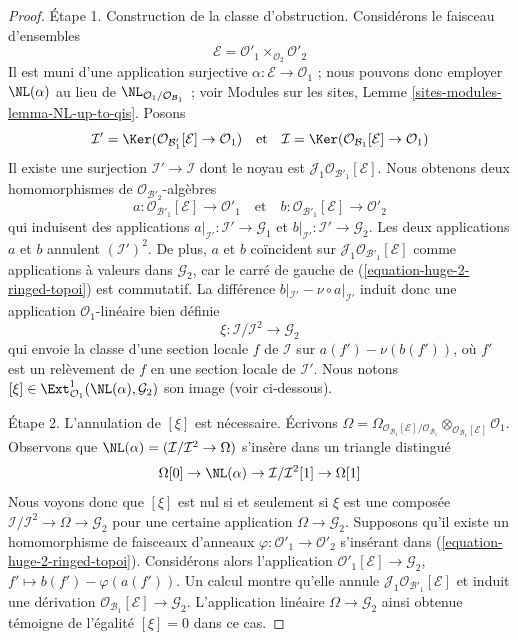 \begin{proof}
\medskip\noindent
Étape 1. Construction de la classe d'obstruction. Considérons le faisceau
d'ensembles
$$
\mathcal{E} = \mathcal{O}'_1 \times_{\mathcal{O}_2} \mathcal{O}'_2
$$
Il est muni d'une application surjective
$\alpha : \mathcal{E} \to \mathcal{O}_1$ ; nous pouvons donc employer
$\NL(\alpha)$ au lieu de
$\NL_{\mathcal{O}_1/\mathcal{O}_{\mathcal{B}_1}}$ ; voir Modules sur les sites,
Lemme \ref{sites-modules-lemma-NL-up-to-qis}.
Posons
$$
\mathcal{I}' =
\Ker(\mathcal{O}_{\mathcal{B}'_1}[\mathcal{E}] \to \mathcal{O}_1)
\quad\text{et}\quad
\mathcal{I} =
\Ker(\mathcal{O}_{\mathcal{B}_1}[\mathcal{E}] \to \mathcal{O}_1)
$$
Il existe une surjection $\mathcal{I}' \to \mathcal{I}$ dont le noyau est
$\mathcal{J}_1\mathcal{O}_{\mathcal{B}'_1}[\mathcal{E}]$.
Nous obtenons deux homomorphismes de $\mathcal{O}_{\mathcal{B}'_2}$-algèbres
$$
a : \mathcal{O}_{\mathcal{B}'_1}[\mathcal{E}] \to \mathcal{O}'_1
\quad\text{et}\quad
b : \mathcal{O}_{\mathcal{B}'_1}[\mathcal{E}] \to \mathcal{O}'_2
$$
qui induisent des applications
$a|_{\mathcal{I}'} : \mathcal{I}' \to \mathcal{G}_1$ et
$b|_{\mathcal{I}'} : \mathcal{I}' \to \mathcal{G}_2$. Les deux applications
$a$ et $b$ annulent $(\mathcal{I}')^2$. De plus, $a$ et $b$ coïncident sur
$\mathcal{J}_1\mathcal{O}_{\mathcal{B}'_1}[\mathcal{E}]$ comme applications
à valeurs dans $\mathcal{G}_2$, car le carré de gauche de
(\ref{equation-huge-2-ringed-topoi}) est commutatif. La différence
$b|_{\mathcal{I}'} - \nu \circ a|_{\mathcal{I}'}$ induit donc une application
$\mathcal{O}_1$-linéaire bien définie
$$
\xi : \mathcal{I}/\mathcal{I}^2 \longrightarrow \mathcal{G}_2
$$
qui envoie la classe d'une section locale $f$ de $\mathcal{I}$ sur
$a(f') - \nu(b(f'))$, où $f'$ est un relèvement de $f$ en une section locale
de $\mathcal{I}'$. Nous notons
$[\xi] \in \Ext^1_{\mathcal{O}_1}(\NL(\alpha), \mathcal{G}_2)$ son image
(voir ci-dessous).

\medskip\noindent
Étape 2. L'annulation de $[\xi]$ est nécessaire. Écrivons
$\Omega =
\Omega_{\mathcal{O}_{\mathcal{B}_1}[\mathcal{E}]/\mathcal{O}_{\mathcal{B}_1}}
\otimes_{\mathcal{O}_{\mathcal{B}_1}[\mathcal{E}]} \mathcal{O}_1$.
Observons que $\NL(\alpha) = (\mathcal{I}/\mathcal{I}^2 \to \Omega)$ s'insère
dans un triangle distingué
$$
\Omega[0] \to
\NL(\alpha) \to
\mathcal{I}/\mathcal{I}^2[1] \to
\Omega[1]
$$
Nous voyons donc que $[\xi]$ est nul si et seulement si $\xi$ est une composée
$\mathcal{I}/\mathcal{I}^2 \to \Omega \to \mathcal{G}_2$ pour une certaine
application $\Omega \to \mathcal{G}_2$.
Supposons qu'il existe un homomorphisme de faisceaux d'anneaux
$\varphi : \mathcal{O}'_1 \to \mathcal{O}'_2$ s'insérant dans
(\ref{equation-huge-2-ringed-topoi}). Considérons alors l'application
$\mathcal{O}'_1[\mathcal{E}] \to \mathcal{G}_2$,
$f' \mapsto b(f') - \varphi(a(f'))$. Un calcul montre qu'elle annule
$\mathcal{J}_1\mathcal{O}_{\mathcal{B}'_1}[\mathcal{E}]$ et induit une
dérivation $\mathcal{O}_{\mathcal{B}_1}[\mathcal{E}] \to \mathcal{G}_2$.
L'application linéaire $\Omega \to \mathcal{G}_2$ ainsi obtenue témoigne de
l'égalité $[\xi] = 0$ dans ce cas.


\end{proof}
